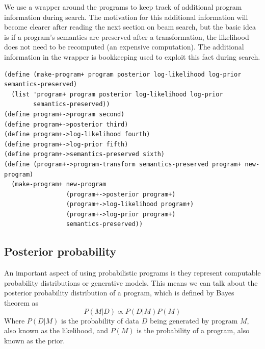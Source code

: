 \documentclass[a4paper,10pt]{article}
\begin{document}
We use a wrapper around the programs to keep track of additional program information during search.  The motivation for this additional information will become clearer after reading the next section on beam search, but the basic idea is if a program's semantics are preserved after a transformation, the likelihood does not need to be recomputed (an expensive computation). The additional information in the wrapper is bookkeeping used to exploit this fact during search.  
\begin{lstlisting}[frame=trBL]
(define (make-program+ program posterior log-likelihood log-prior semantics-preserved)
  (list 'program+ program posterior log-likelihood log-prior 
        semantics-preserved))
(define program+->program second)
(define program+->posterior third)
(define program+->log-likelihood fourth)
(define program+->log-prior fifth)
(define program+->semantics-preserved sixth)
(define (program+->program-transform semantics-preserved program+ new-program)
  (make-program+ new-program 
                 (program+->posterior program+) 
                 (program+->log-likelihood program+) 
                 (program+->log-prior program+) 
                 semantics-preserved))
\end{lstlisting}


\subsection{Posterior probability}
An important aspect of using probabilistic programs is they represent computable probability distributions or generative models.  This means we can talk about the posterior probability distribution of a program, which is defined by Bayes theorem as 
\begin{equation}P(M|D)\propto P(D|M)P(M)\end{equation}
Where $P(D|M)$ is the probability of data $D$ being generated by program $M$, also known as the likelihood, and $P(M)$ is the probability of a program, also known as the prior.
\end{document}
